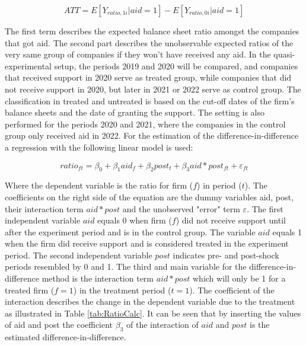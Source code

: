 \begin{equation}
    ATT = E[Y_{ratio,1i}| aid=1]-E[Y_{ratio,0i}| aid=1] 
    \label{eqn:ATT}
\end{equation}

The first term describes the expected balance sheet ratio amongst the companies that got aid. The second part describes the unobservable expected ratios of the very same group of companies if they won't have received any aid. In the quasi-experimental setup, the periods 2019 and 2020 will be compared, and companies that received support in 2020 serve as treated group, while companies that did not receive support in 2020, but later in 2021 or 2022 serve as control group. The classification in treated and untreated is based on the cut-off dates of the firm's balance sheets and the date of granting the support. The setting is also performed for the periods 2020 and 2021, where the companies in the control group only received aid in 2022. For the estimation of the difference-in-difference a regression with the following linear model is used:


\begin{equation}
    ratio_{ft} = \beta_{0} + \beta_{1}aid_{f} + \beta_{2}post_{t} + \beta_{3}aid\ast post_{ft} + \varepsilon_{ft} 
    \label{eqn:Diff&Diff}
\end{equation}

Where the dependent variable is the ratio for firm ($f$) in period ($t$). The coefficients on the right side of the equation are the dummy variables aid, post, their interaction term $ aid\ast post$ and the unobserved "error" term $ \varepsilon$. The first independent variable $aid$ equals 0 when firm ($f$) did not receive support until after the experiment period and is in the control group. The variable $aid$ equals 1 when the firm did receive support and is considered treated in the experiment period. The second independent variable $post$ indicates pre- and post-shock periods resembled by 0 and 1. The third and main variable for the difference-in-difference method is the interaction term $ aid\ast post$ which will only be 1 for a treated firm ($f=1$) in the treatment period ($t=1$). The coefficient of the interaction describes the change in the dependent variable due to the treatment as illustrated in Table \ref{tab:RatioCalc}. It can be seen that by inserting the values of aid and post the coefficient $\beta_{3}$ of the interaction of $aid$ and $post$ is the estimated difference-in-difference.

